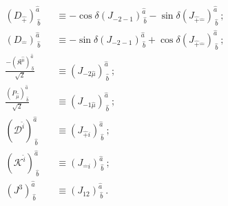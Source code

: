 \documentclass[foundations,article,submit,pdftex,moreauthors]{Definitions/mdpi}
\begin{document}
\begin{eqnarray}
    (D_{\hat{+}})^{\hat{a}}_{~\hat{b}}&&\equiv -\cos{\delta}(J_{-2-1})^{\hat{a}}_{~\hat{b}}-\sin{\delta}(J_{\hat{+}\hat{-}})^{\hat{a}}_{~\hat{b}}~;\nonumber\\
    (D_{\hat{-}})^{\hat{a}}_{~\hat{b}}&&\equiv -\sin{\delta}(J_{-2-1})^{\hat{a}}_{~\hat{b}}+\cos{\delta}(J_{\hat{+}\hat{-}})^{\hat{a}}_{~\hat{b}}~;\nonumber\\
    \frac{-(\mathfrak{K}^{\hat{\mu}})^{\hat{a}}_{~\hat{b}}}{\sqrt{2}}&&\equiv (J_{-2\hat{\mu}})^{\hat{a}}_{~\hat{b}}~;\nonumber\\
    \frac{(P_{\hat{\mu}})^{\hat{a}}_{~\hat{b}}}{\sqrt{2}}&&\equiv (J_{-1\hat{\mu}})^{\hat{a}}_{~\hat{b}}~;\nonumber\\
    (\mathcal{D}^{\hat{i}})^{\hat{a}}_{~\hat{b}}&&\equiv (J_{\hat{+}i})^{\hat{a}}_{~\hat{b}}~;\nonumber\\(\mathcal{K}^{\hat{i}})^{\hat{a}}_{~\hat{b}}&&\equiv (J_{\hat{-}i})^{\hat{a}}_{~\hat{b}}~;\nonumber\\
    (J^3)^{\hat{a}}_{~\hat{b}}&&\equiv (J_{12})^{\hat{a}}_{~\hat{b}}~.
    \label{implicit6x6}
\end{eqnarray}
\end{document}
